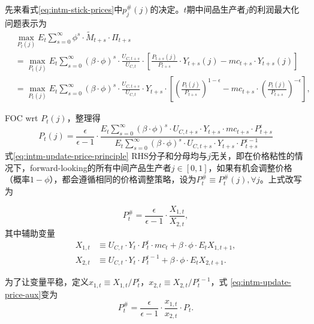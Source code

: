 先来看式\eqref{eq:intm-stick-prices}中$p^{\#}_j(j)$的决定。$t$期中间品生产者$j$的利润最大化问题表示为
\begin{equation*}
  \begin{split}
    &\max_{P_t(j)} E_t \sum_{s=0}^{\infty} \phi^s \cdot \tilde{M}_{t+s} \cdot \Pi_{t+s} \\
    &=\max_{P_t(j)} E_t \sum_{s=0}^{\infty} \left(\beta \cdot \phi \right)^s \cdot \frac{U_{C,t+s}}{U_{C,t}} \cdot \left[
      \frac{P_{t+s}(j)}{P_{t+s}} \cdot Y_{t+s}(j) - mc_{t+s} \cdot Y_{t+s}(j)
    \right]\\
    &=\max_{P_t(j)} E_t \sum_{s=0}^{\infty} \left(\beta \cdot \phi \right)^s \cdot \frac{U_{C,t+s}}{U_{C,t}} \cdot Y_{t+s} \cdot
    \left[
      \left( \frac{P_{t}(j)}{P_{t+s}} \right)^{1-\epsilon} - mc_{t+s} \cdot \left( \frac{P_{t}(j)}{P_{t+s}} \right)^{-\epsilon}
    \right],
  \end{split}
\end{equation*}

FOC wrt $P_{t}(j)$，整理得
\begin{equation}
  \label{eq:intm-update-price-principle}
  P_{t}(j) = \frac{\epsilon}{\epsilon -1} \cdot \frac
{
  E_t \sum_{s=0}^{\infty} \left(\beta \cdot \phi \right)^s \cdot U_{C,t+s} \cdot Y_{t+s} \cdot mc_{t+s} \cdot P_{t+s}^{\epsilon}
}
{
  E_t \sum_{s=0}^{\infty} \left(\beta \cdot \phi \right)^s \cdot U_{C,t+s} \cdot Y_{t+s} \cdot P_{t+s}^{\epsilon-1}
}
\end{equation}
式\eqref{eq:intm-update-price-principle} RHS分子和分母均与$j$无关，即在价格粘性的情况下，forward-looking的所有中间产品生产者$j\in[0,1]$，如果有机会调整价格（概率$1-\phi$），都会遵循相同的价格调整策略，设为$P^{\#}_{t} \equiv P^{\#}_{t}(j), \forall j$。上式改写为

\begin{equation}
  \label{eq:intm-update-price-aux}
  P^{\#}_t = \frac{\epsilon}{\epsilon  -1} \cdot \frac{X_{1,t}}{X_{2,t}},
\end{equation}
其中辅助变量
\begin{align}
\label{auxiliary-X1}
  X_{1,t} &\equiv U_{C,t} \cdot Y_t \cdot P_{t}^{\epsilon} \cdot mc_t + \beta \cdot \phi \cdot E_t X_{1,t+1},\\
\label{auxiliary-X2}
  X_{2,t} &\equiv U_{C,t} \cdot Y_t \cdot P_{t}^{\epsilon-1} + \beta \cdot \phi \cdot E_t X_{2,t+1}.
\end{align}

为了让变量平稳，定义$x_{1,t} \equiv X_{1,t}/P_{t}^{\epsilon}$，$x_{2,t} \equiv X_{2,t}/P_{t}^{\epsilon-1}$，式  \eqref{eq:intm-update-price-aux}变为
\begin{equation}
  \label{eq:intm-update-price-aux-stationary}
  P^{\#}_t = \frac{\epsilon}{\epsilon  -1} \cdot \frac{x_{1,t}}{x_{2,t}} \cdot P_t.
\end{equation}

